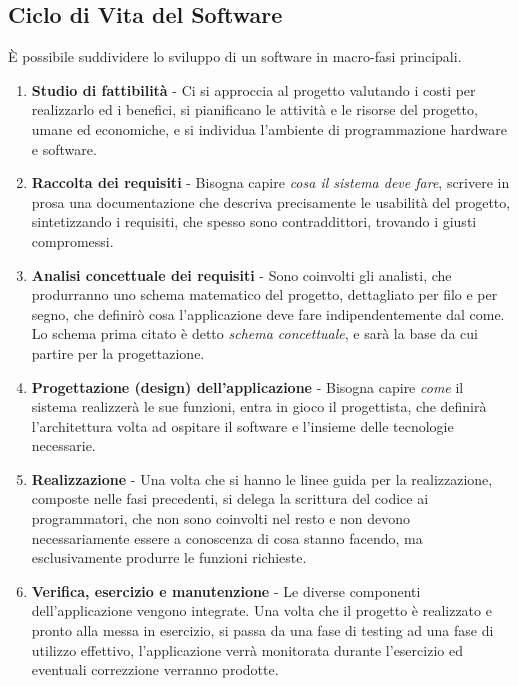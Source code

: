 \documentclass[12pt, letterpaper]{article}
\begin{document}
\subsection{Ciclo di Vita del Software}
È possibile suddividere lo sviluppo di un software in macro-fasi principali.\begin{enumerate}
    \item \textbf{Studio di fattibilità} - Ci si approccia al progetto valutando i costi per realizzarlo ed 
    i benefici, si pianificano le attività e le risorse del progetto, umane ed economiche, e si individua l'ambiente
    di programmazione hardware e software. 
    \item \textbf{Raccolta dei requisiti} - Bisogna capire \textit{cosa il sistema deve fare}, scrivere in prosa 
    una documentazione che descriva precisamente le usabilità del progetto, sintetizzando i requisiti, che spesso 
    sono contraddittori, trovando i giusti compromessi.
    \item \textbf{Analisi concettuale dei requisiti} - Sono coinvolti gli analisti, che produrranno uno schema 
    matematico del progetto, dettagliato per filo e per segno, che definirò cosa l'applicazione deve fare 
    indipendentemente dal come. Lo schema prima citato è detto \textit{schema concettuale}, e sarà la base 
    da cui partire per la progettazione.
    \item \textbf{Progettazione (design) dell'applicazione} -  Bisogna capire \textit{come} il sistema 
    realizzerà le sue funzioni, entra in gioco il progettista, che definirà l'architettura volta ad ospitare 
    il software e l'insieme delle tecnologie necessarie.
    \item \textbf{Realizzazione} - Una volta che si hanno le linee guida per la realizzazione, composte 
    nelle fasi precedenti, si delega la scrittura del codice ai programmatori, che non sono coinvolti nel resto 
    e non devono necessariamente essere a conoscenza di cosa stanno facendo, ma esclusivamente produrre 
    le funzioni richieste.
    \item \textbf{Verifica, esercizio e manutenzione} - Le diverse componenti dell'applicazione vengono 
    integrate. Una volta che il progetto è realizzato e pronto alla 
    messa in esercizio, si passa da una fase di testing ad una fase di utilizzo effettivo, l'applicazione verrà 
    monitorata durante l'esercizio ed eventuali correzzione verranno prodotte.
\end{enumerate}
\end{document}
